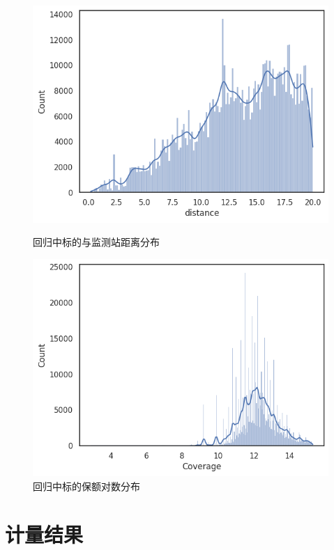 \begin{figure}[H]
    \begin{minipage}{0.48\linewidth}
        \includegraphics[width=\linewidth]{lib/img/olsdistance.png}
        \caption{回归中标的与监测站距离分布}
    \end{minipage}
    \begin{minipage}{0.48\linewidth}
        \includegraphics[width=\linewidth]{lib/img/coverage.png}
        \caption{回归中标的保额对数分布}
    \end{minipage}
\end{figure}

\section{计量结果}
